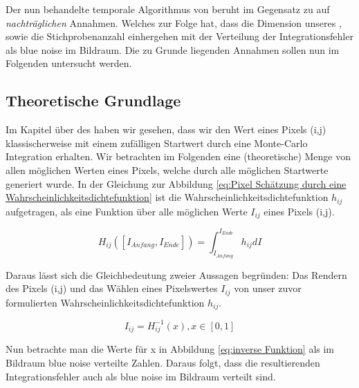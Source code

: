 Der nun behandelte temporale Algorithmus von \cite{hal02158423} beruht 
im Gegensatz zu \cite{georgiev2016blue} auf \textit{nachträglichen} 
Annahmen. Welches zur Folge hat, dass die Dimension unseres
, sowie die Stichprobenanzahl einhergehen 
mit der Verteilung der Integrationsfehler als blue noise im Bildraum.
Die zu Grunde liegenden Annahmen sollen nun im Folgenden untersucht werden.

\subsection{Theoretische Grundlage}
Im Kapitel über des  haben wir gesehen, dass 
wir den Wert eines Pixels (i,j) klassischerweise mit einem zufälligen
Startwert durch eine Monte-Carlo Integration erhalten. Wir betrachten im
Folgenden eine (theoretische) Menge von allen möglichen Werten eines 
Pixels, welche durch alle möglichen Startwerte generiert wurde.
In der Gleichung zur Abbildung \ref{eq:Pixel Schätzung durch eine Wahrscheinlichkeitsdichtefunktion} ist die Wahrscheinlichkeitsdichtefunktion
$h_{ij}$ aufgetragen, als eine Funktion über alle möglichen Werte 
$I_{ij}$ eines Pixels (i,j).

\begin{equation}\label{eq:Pixel Schätzung durch eine Wahrscheinlichkeitsdichtefunktion}
    H_{ij}([I_{Anfang},I_{Ende}]) = \int_{I_{Anfang}}^{I_{Ende}} h_{ij} dI
\end{equation}

Daraus lässt sich die Gleichbedeutung zweier Aussagen begründen:
Das Rendern des Pixels (i,j) und das Wählen eines Pixelswertes $I_{ij}$
von unser zuvor formulierten Wahrscheinlichkeitsdichtefunktion $h_{ij}$.

\begin{equation}\label{eq:inverse Funktion}
    I_{ij} = H_{ij}^{-1}(x), x \in [0,1]
\end{equation}

Nun betrachte man die Werte für x in Abbildung \ref{eq:inverse Funktion} als im Bildraum
blue noise verteilte Zahlen. Daraus folgt, dass die resultierenden
Integrationsfehler auch als blue noise im Bildraum verteilt sind.



